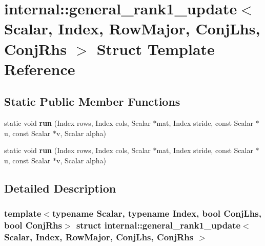 \hypertarget{structinternal_1_1general__rank1__update_3_01_scalar_00_01_index_00_01_row_major_00_01_conj_lhs_00_01_conj_rhs_01_4}{}\section{internal\+:\+:general\+\_\+rank1\+\_\+update$<$ Scalar, Index, Row\+Major, Conj\+Lhs, Conj\+Rhs $>$ Struct Template Reference}
\label{structinternal_1_1general__rank1__update_3_01_scalar_00_01_index_00_01_row_major_00_01_conj_lhs_00_01_conj_rhs_01_4}
\subsection*{Static Public Member Functions}
\begin{DoxyCompactItemize}
\item 
\mbox{\label{structinternal_1_1general__rank1__update_3_01_scalar_00_01_index_00_01_row_major_00_01_conj_lhs_00_01_conj_rhs_01_4_a6b914fe81089d6d7e21de7561272b0b1}} 
static void {\bfseries run} (Index rows, Index cols, Scalar $\ast$mat, Index stride, const Scalar $\ast$u, const Scalar $\ast$v, Scalar alpha)
\item 
\mbox{\label{structinternal_1_1general__rank1__update_3_01_scalar_00_01_index_00_01_row_major_00_01_conj_lhs_00_01_conj_rhs_01_4_a6b914fe81089d6d7e21de7561272b0b1}} 
static void {\bfseries run} (Index rows, Index cols, Scalar $\ast$mat, Index stride, const Scalar $\ast$u, const Scalar $\ast$v, Scalar alpha)
\end{DoxyCompactItemize}


\subsection{Detailed Description}
\subsubsection*{template$<$typename Scalar, typename Index, bool Conj\+Lhs, bool Conj\+Rhs$>$\newline
struct internal\+::general\+\_\+rank1\+\_\+update$<$ Scalar, Index, Row\+Major, Conj\+Lhs, Conj\+Rhs $>$}



